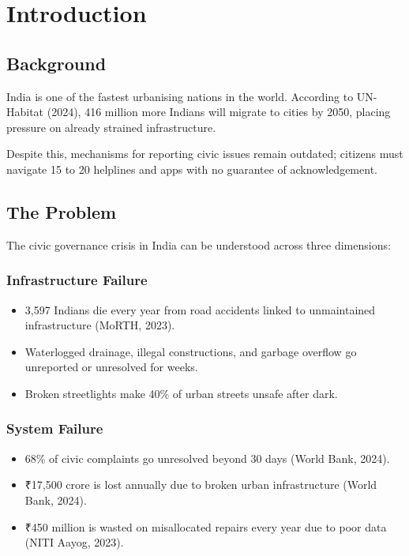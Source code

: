 \documentclass[12pt,a4paper]{report}
\begin{document}
\chapter{Introduction}

\section{Background}

India is one of the fastest urbanising nations in the world. According to
UN-Habitat (2024), 416 million more Indians will migrate to cities by 2050,
placing pressure on already strained infrastructure.

Despite this, mechanisms for reporting civic issues remain outdated; citizens must
navigate 15 to 20 helplines and apps with no guarantee of acknowledgement.

\section{The Problem}

The civic governance crisis in India can be understood across three dimensions:

\subsection{Infrastructure Failure}

\begin{itemize}
    \item 3,597 Indians die every year from road accidents linked to
    unmaintained infrastructure (MoRTH, 2023).
    \item Waterlogged drainage, illegal constructions, and garbage overflow go
    unreported or unresolved for weeks.
    \item Broken streetlights make 40\% of urban streets unsafe after dark.
\end{itemize}

\subsection{System Failure}

\begin{itemize}
    \item 68\% of civic complaints go unresolved beyond 30 days
    (World Bank, 2024).
    \item ₹17,500 crore is lost annually due to broken urban infrastructure
    (World Bank, 2024).
    \item ₹450 million is wasted on misallocated repairs every year due to
    poor data (NITI Aayog, 2023).
\end{itemize}
\end{document}
